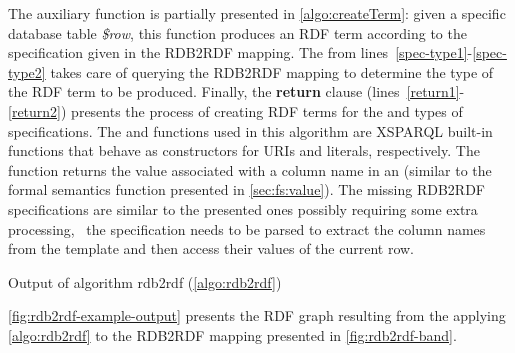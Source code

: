 \begin{algorithm}[t]
  \caption{ }
  \label{algo:createTerm}
  \DontPrintSemicolon
  \SPARQLForClause * \; 
   
\end{algorithm}
%
The auxiliary function  is partially presented in \cref{algo:createTerm}: given a specific database
table \emph{\$row}, this function produces an \ac{RDF} term according to the specification given in the RDB2RDF mapping.
The \SparqlForClause from lines~\ref{spec-type1}-\ref{spec-type2} takes care of querying the RDB2RDF mapping to
determine the type of the \ac{RDF} term to be produced. Finally, the \textbf{return} clause
(lines~\ref{return1}-\ref{return2}) presents the process of creating \ac{RDF} terms for the  and
 types of specifications.  The  and  functions used in this
algorithm are XSPARQL built-in functions that behave as constructors for \acp{URI} and literals, respectively.
%
The  function returns the value associated with a column name in an  (similar to the formal
semantics function presented in \cref{sec:fs:value}).
%
The missing RDB2RDF specifications are similar to the presented ones possibly requiring some extra processing, \eg~the
 specification needs to be parsed to extract the column names from the template and then access
their values of the current row.



\begin{data}[t]
  \centering
  
  \caption{Output of algorithm rdb2rdf (\cref{algo:rdb2rdf})}
  \label{fig:rdb2rdf-example-output}
\end{data}
%
\cref{fig:rdb2rdf-example-output} presents the \ac{RDF} graph resulting from the applying
\cref{algo:rdb2rdf} to the RDB2RDF mapping presented in \cref{fig:rdb2rdf-band}.






